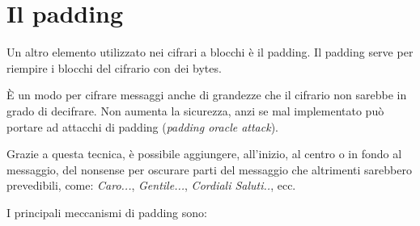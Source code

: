 
\textsf{\small }




\section{Il padding}

\textsf{\small Un altro elemento utilizzato nei cifrari a blocchi è il padding. }
\textsf{\small Il padding serve per riempire i blocchi del cifrario con dei bytes.}

\textsf{\small È un modo per cifrare messaggi anche di grandezze che il cifrario non sarebbe in grado di decifrare.}
\textsf{\small Non aumenta la sicurezza, anzi se mal implementato può portare ad attacchi di padding (\emph{padding oracle attack}).} %

\textsf{\small Grazie a questa tecnica, è possibile aggiungere, all'inizio, al centro o in fondo al messaggio, del nonsense per oscurare parti del messaggio che altrimenti sarebbero prevedibili, come: \emph{Caro...}, \emph{Gentile...}, \emph{Cordiali Saluti..}, ecc.}

\textsf{\small I principali meccanismi di padding sono: }

